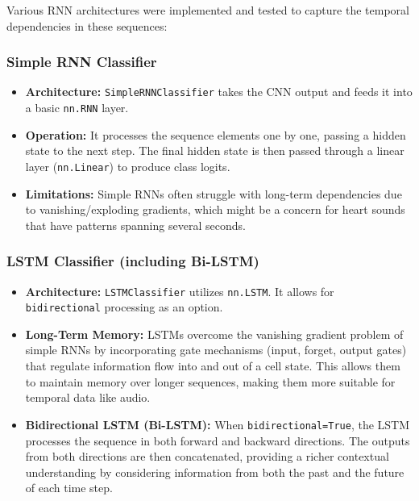 \documentclass[a4paper]{article}
\begin{document}
\begin{multicols}{2}
Various RNN architectures were implemented and tested to capture the temporal dependencies in these sequences:

\subsubsection{Simple RNN Classifier}
\begin{itemize}
    \item \textbf{Architecture:} \texttt{SimpleRNNClassifier} takes the CNN output and feeds it into a basic \texttt{nn.RNN} layer.
    \item \textbf{Operation:} It processes the sequence elements one by one, passing a hidden state to the next step. The final hidden state is then passed through a linear layer (\texttt{nn.Linear}) to produce class logits.
    \item \textbf{Limitations:} Simple RNNs often struggle with long-term dependencies due to vanishing/exploding gradients, which might be a concern for heart sounds that have patterns spanning several seconds.
\end{itemize}

\subsubsection{LSTM Classifier (including Bi-LSTM)}
\begin{itemize}
    \item \textbf{Architecture:} \texttt{LSTMClassifier} utilizes \texttt{nn.LSTM}. It allows for \texttt{bidirectional} processing as an option.
    \item \textbf{Long-Term Memory:} LSTMs overcome the vanishing gradient problem of simple RNNs by incorporating gate mechanisms (input, forget, output gates) that regulate information flow into and out of a cell state. This allows them to maintain memory over longer sequences, making them more suitable for temporal data like audio.
    \item \textbf{Bidirectional LSTM (Bi-LSTM):} When \texttt{bidirectional=True}, the LSTM processes the sequence in both forward and backward directions. The outputs from both directions are then concatenated, providing a richer contextual understanding by considering information from both the past and the future of each time step.
\end{itemize}


\end{multicols}
\end{document}
